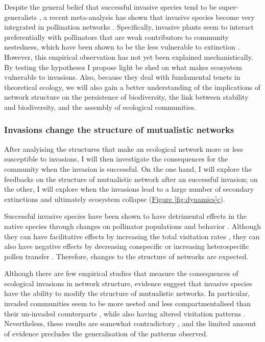\documentclass[a4paper]{article}
\begin{document}
Despite the general belief that successful invasive species tend to be super-generalists \autocite{Richardson2000, Aizen2008, Vila2009, Albrecht2014}, a recent meta-analysis has shown that invasive species become very integrated in pollination networks \autocite{Stouffer2014}.
Specifically, invasive plants seem to interact preferentially with pollinators that are weak contributors to community nestedness, which have been shown to be the less vulnerable to extinction \autocite{Saavedra2011, Stouffer2014}.
However, this empirical observation has not yet been explained mechanistically.
By testing the hypotheses I propose light be shed on what makes ecosystem vulnerable to invasions.
Also, because they deal with fundamental tenets in theoretical ecology, we will also gain a better understanding of the implications of network structure on the persistence of biodiversity, the link between stability and biodiversity, and the assembly of ecological communities.

\subsubsection*{Invasions change the structure of mutualistic networks}

After analyising the structures that make an ecological network more or less susceptible to invasions, I will then investigate the consequences for the community when the invasion is successful.
On the one hand, I will explore the feedbacks on the structure of mutualistic network after an successful invasion; on the other, I will explore when the invasions lead to a large number of secondary extinctions and ultimately ecosystem collapse (\hyperref[fig:dynamics]{Figure \ref{fig:dynamics}c}).

Successful invasive species have been shown to have detrimental effects in the native species through changes on pollinator populations and behavior \autocite{Christian2001, Bjerknes2007, Morales2009, Vila2009}.
Although they can have facilitative effects by increasing the total visitation rates \autocite{Bjerknes2007, Sargent2008}, they can also have negative effects by decreasing conspecific or increasing heterospecific pollen transfer \autocite{Morales2009}.
Therefore, changes to the structure of networks are expected.

Although there are few empirical studies that measure the consequences of ecological invasions in network structure, evidence suggest that invasive species have the ability to modify the structure of mutualistic networks.
In particular, invaded communities seem to be more nested \autocite{Bartomeus2008, Stouffer2014} and less compartmentalised \autocite{Albrecht2014} than their un-invaded counterparts , while also having altered visitation patterns \autocite{Vila2009}.
Nevertheless, these results are somewhat contradictory \autocite{Gilberto2012}, and the limited amount of evidence precludes the generalisation of the patterns observed.
\end{document}
